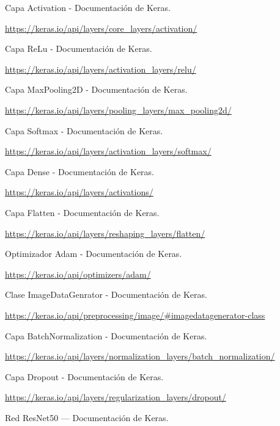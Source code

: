 \documentclass[12pt, spanish]{article}
\begin{document}
\begin{thebibliography}{9}

	Capa Activation - Documentación de Keras.

	\url{https://keras.io/api/layers/core_layers/activation/}


	Capa ReLu - Documentación de Keras.

	\url{https://keras.io/api/layers/activation_layers/relu/}


	Capa MaxPooling2D - Documentación de Keras.

	\url{https://keras.io/api/layers/pooling_layers/max_pooling2d/}


	Capa Softmax - Documentación de Keras.

	\url{https://keras.io/api/layers/activation_layers/softmax/}


	Capa Dense - Documentación de Keras.

	\url{https://keras.io/api/layers/activations/}


	Capa Flatten - Documentación de Keras.

	\url{https://keras.io/api/layers/reshaping_layers/flatten/}


	Optimizador Adam - Documentación de Keras.

	\url{https://keras.io/api/optimizers/adam/}


	Clase ImageDataGenrator - Documentación de Keras.

	\url{https://keras.io/api/preprocessing/image/#imagedatagenerator-class}



	Capa BatchNormalization - Documentación de Keras.

	\url{https://keras.io/api/layers/normalization_layers/batch_normalization/}



	Capa Dropout - Documentación de Keras.

	\url{https://keras.io/api/layers/regularization_layers/dropout/}


Red ResNet50 --- Documentación de Keras.


\end{thebibliography}
\end{document}
